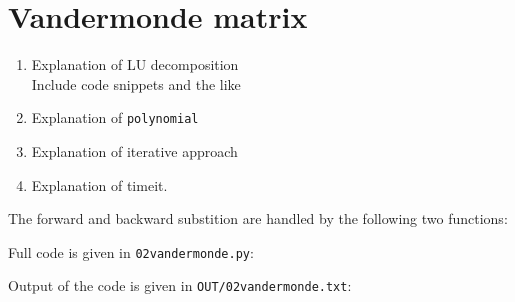 \section{Vandermonde matrix}
\begin{enumerate}[label=(\alph*)]
    \item Explanation of LU decomposition\\
          Include code snippets and the like
    \item Explanation of \texttt{polynomial}
    \item Explanation of iterative approach
    \item Explanation of timeit.
\end{enumerate}

The forward and backward substition are handled by the following two functions:

Full code is given in \texttt{02vandermonde.py}:


Output of the code is given in \texttt{OUT/02vandermonde.txt}:


